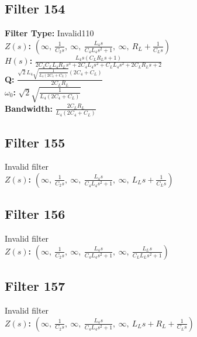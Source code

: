 \documentclass{article}
\begin{document}
\subsection*{Filter 154}
\textbf{Filter Type:} Invalid110 \\ 
\textbf{$Z(s)$:} $\left( \infty, \  \frac{1}{C_{2} s}, \  \infty, \  \frac{L_{4} s}{C_{4} L_{4} s^{2} + 1}, \  \infty, \  R_{L} + \frac{1}{C_{L} s}\right)$ \\ 
\textbf{$H(s)$:} $\frac{L_{4} s \left(C_{L} R_{L} s + 1\right)}{2 C_{4} C_{L} L_{4} R_{L} s^{3} + 2 C_{4} L_{4} s^{2} + C_{L} L_{4} s^{2} + 2 C_{L} R_{L} s + 2}$ \\ 
\textbf{Q:} $\frac{\sqrt{2} L_{4} \sqrt{\frac{1}{L_{4} \left(2 C_{4} + C_{L}\right)}} \left(2 C_{4} + C_{L}\right)}{2 C_{L} R_{L}}$ \\ 
\textbf{$\omega_0$:} $\sqrt{2} \sqrt{\frac{1}{L_{4} \left(2 C_{4} + C_{L}\right)}}$ \\ 
\textbf{Bandwidth:} $\frac{2 C_{L} R_{L}}{L_{4} \left(2 C_{4} + C_{L}\right)}$ \\ 
\subsection*{Filter 155}
Invalid filter \\ 
\textbf{$Z(s)$:} $\left( \infty, \  \frac{1}{C_{2} s}, \  \infty, \  \frac{L_{4} s}{C_{4} L_{4} s^{2} + 1}, \  \infty, \  L_{L} s + \frac{1}{C_{L} s}\right)$ \\ 
\subsection*{Filter 156}
Invalid filter \\ 
\textbf{$Z(s)$:} $\left( \infty, \  \frac{1}{C_{2} s}, \  \infty, \  \frac{L_{4} s}{C_{4} L_{4} s^{2} + 1}, \  \infty, \  \frac{L_{L} s}{C_{L} L_{L} s^{2} + 1}\right)$ \\ 
\subsection*{Filter 157}
Invalid filter \\ 
\textbf{$Z(s)$:} $\left( \infty, \  \frac{1}{C_{2} s}, \  \infty, \  \frac{L_{4} s}{C_{4} L_{4} s^{2} + 1}, \  \infty, \  L_{L} s + R_{L} + \frac{1}{C_{L} s}\right)$ \\ 
\end{document}
